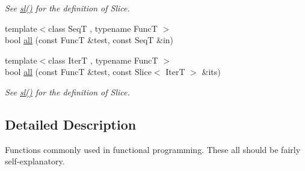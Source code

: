 \begin{DoxyCompactItemize}
\begin{DoxyCompactList}\small\item\em See \hyperlink{namespaceseq_a01ecaea35db083541a258a05ac8c1d30}{sl()} for the definition of {\ttfamily Slice}. \end{DoxyCompactList}\item 
{\footnotesize template$<$class Seq\-T , typename Func\-T $>$ }\\bool \hyperlink{namespaceseq_1_1functional_a82c784896f9bceea9de4fb2d4fe7c7d0}{all} (const Func\-T \&test, const Seq\-T \&in)
\item 
{\footnotesize template$<$class Iter\-T , typename Func\-T $>$ }\\bool \hyperlink{namespaceseq_1_1functional_a998fd793e37a300a5b6b044e96716f5d}{all} (const Func\-T \&test, const Slice$<$ Iter\-T $>$ \&its)
\begin{DoxyCompactList}\small\item\em See \hyperlink{namespaceseq_a01ecaea35db083541a258a05ac8c1d30}{sl()} for the definition of {\ttfamily Slice}. \end{DoxyCompactList}\end{DoxyCompactItemize}


\subsection{Detailed Description}
Functions commonly used in functional programming. These all should be fairly self-\/explanatory. 

